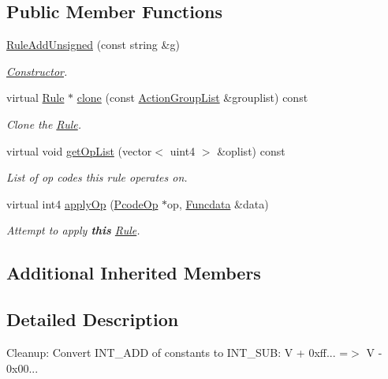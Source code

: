 \subsection*{Public Member Functions}
\begin{DoxyCompactItemize}
\item 
\mbox{\hyperlink{class_rule_add_unsigned_af3ef72b4f5726b2d0f8b3bf76eaedb65}{Rule\+Add\+Unsigned}} (const string \&g)
\begin{DoxyCompactList}\small\item\em \mbox{\hyperlink{class_constructor}{Constructor}}. \end{DoxyCompactList}\item 
virtual \mbox{\hyperlink{class_rule}{Rule}} $\ast$ \mbox{\hyperlink{class_rule_add_unsigned_a6cb39fff450ccb1e748e5d5fd2b6f110}{clone}} (const \mbox{\hyperlink{class_action_group_list}{Action\+Group\+List}} \&grouplist) const
\begin{DoxyCompactList}\small\item\em Clone the \mbox{\hyperlink{class_rule}{Rule}}. \end{DoxyCompactList}\item 
virtual void \mbox{\hyperlink{class_rule_add_unsigned_aeea5c9fac04c1f37c830e36e28117cd1}{get\+Op\+List}} (vector$<$ uint4 $>$ \&oplist) const
\begin{DoxyCompactList}\small\item\em List of op codes this rule operates on. \end{DoxyCompactList}\item 
virtual int4 \mbox{\hyperlink{class_rule_add_unsigned_a07c326702413b71711277439c247b932}{apply\+Op}} (\mbox{\hyperlink{class_pcode_op}{Pcode\+Op}} $\ast$op, \mbox{\hyperlink{class_funcdata}{Funcdata}} \&data)
\begin{DoxyCompactList}\small\item\em Attempt to apply {\bfseries{this}} \mbox{\hyperlink{class_rule}{Rule}}. \end{DoxyCompactList}\end{DoxyCompactItemize}
\subsection*{Additional Inherited Members}


\subsection{Detailed Description}
Cleanup\+: Convert I\+N\+T\+\_\+\+A\+DD of constants to I\+N\+T\+\_\+\+S\+UB\+: {\ttfamily V + 0xff... =$>$ V -\/ 0x00...} 

